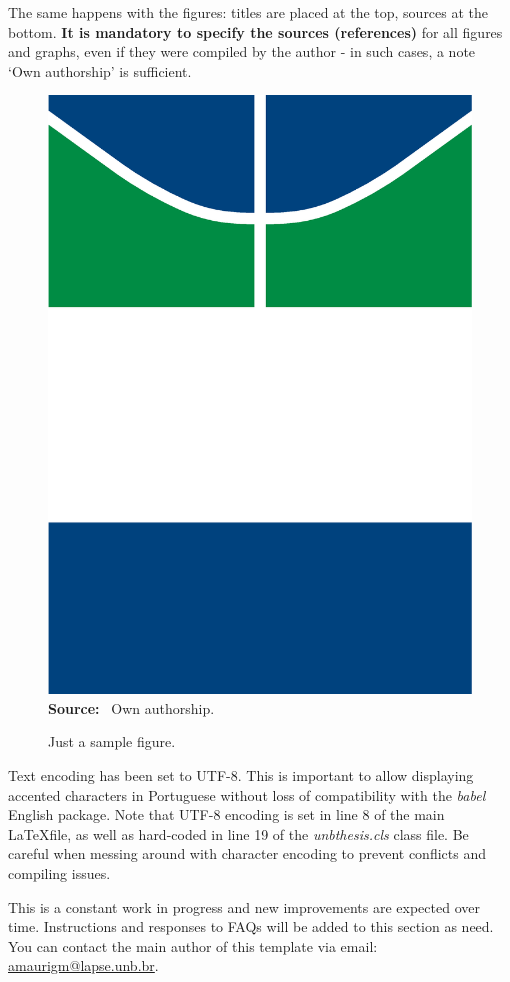 	The same happens with the figures: titles are placed at the top, sources at the bottom. \textbf{It is mandatory to specify the sources (references)} for all figures and graphs, even if they were compiled by the author - in such cases, a note `Own authorship' is sufficient.
	\begin{figure}[H]
		\begin{center}
		\caption{Just a sample figure.} 
			\includegraphics[width=.1\columnwidth]{./CapaUNB_Nova.eps}
				\vspace{0.05cm}\\
		\textbf{Source:} ~Own authorship.\\
				\label{fig:sample_figure}
			\end{center}
		\end{figure}

    Text encoding has been set to UTF-8. This is important to allow displaying accented characters in Portuguese without loss of compatibility with the \textit{babel} English package. Note that UTF-8 encoding is set in line 8 of the main \LaTeX file, as well as hard-coded in line 19 of the \textit{unbthesis.cls} class file. Be careful when messing around with character encoding to prevent conflicts and compiling issues.
    
    This is a constant work in progress and new improvements are expected over time. Instructions and responses to FAQs will be added to this section as need. You can contact the main author of this template via email: \href{mailto:amaurigm@lapse.unb.br}{amaurigm@lapse.unb.br}.